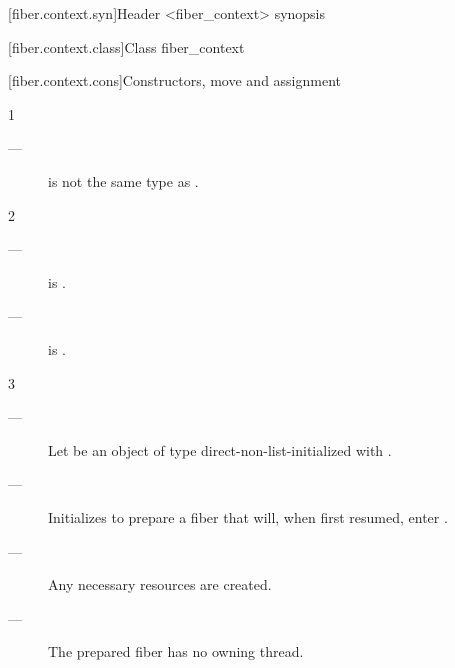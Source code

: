 [fiber.context.syn]{Header <fiber\_context> synopsis}


[fiber.context.class]{Class fiber\_context}


\newcommand{\state}{\cpp{state}}

[fiber.context.cons]{Constructors, move and assignment}


1 \constraints
\begin{description}
    \item[---]  is not the same type as \fiber.
\end{description}

2 \mandates
\begin{description}
    \item[---]  is \true.
    \item[---]  is \true.
\end{description}

3 \effects
\begin{description}
    \item[---] Let  be an object of
               type  direct-non-list-initialized
               with . 
    \item[---] Initializes  to prepare a fiber that will, when
               first resumed, enter .
    \item[---] Any necessary resources are created. 
    \item[---] The prepared fiber has no owning thread.
\end{description}

